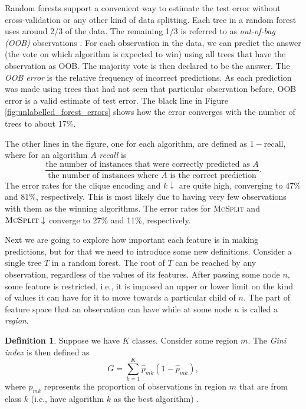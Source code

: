\documentclass{l4proj}
\theoremstyle{definition}
\newtheorem{definition}{Definition}[section]
\theoremstyle{remark}
\begin{document}
Random forests support a convenient way to estimate the test error without
cross-validation or any other kind of data splitting. Each tree in a random
forest uses around 2/3 of the data. The remaining 1/3 is referred to as
\emph{out-of-bag (OOB)} observations \cite{James:2014:ISL:2517747}. For each
observation in the data, we can predict the answer (the vote on which algorithm
is expected to win) using all trees that have the observation as OOB. The
majority vote is then declared to be the answer. The \emph{OOB error} is
the relative frequency of incorrect predictions. As each prediction was made
using trees that had not seen that particular observation before, OOB error is a
valid estimate of test error. The black line in Figure
\ref{fig:unlabelled_forest_errors} shows how the error converges with the number
of trees to about 17\%.

The other lines in the figure, one for each algorithm, are defined as $1 -
\text{recall}$, where for an algorithm $A$ \emph{recall}
\cite{citeulike:12882259} is
\[ \frac{\text{the number of instances that were correctly predicted as
      $A$}}{\text{the number of instances where $A$ is the correct
      prediction}}. \]
The error rates for the clique encoding and $k\downarrow$ are quite high,
converging to 47\% and 81\%, respectively. This is most likely due to having very
few observations with them as the winning algorithms. The error rates for
\textsc{McSplit} and $\textsc{McSplit}\downarrow$ converge to 27\% and 11\%,
respectively.

Next we are going to explore how important each feature is in making
predictions, but for that we need to introduce some new definitions. Consider a
single tree $T$ in a random forest. The root of $T$ can be reached by any
observation, regardless of the values of its features. After passing some node
$n$, some feature is restricted, i.e., it is imposed an upper or lower limit on
the kind of values it can have for it to move towards a particular child of $n$.
The part of feature space that an observation can have while at some node $n$ is
called a \emph{region}.

\begin{definition} %
  Suppose we have $K$ classes. Consider some region $m$. The \emph{Gini index}
  is then defined as
  \[ G = \sum_{k=1}^K \hat{p}_{mk}(1-\hat{p}_{mk}), \]
  where $\hat{p}_{mk}$ represents the proportion of observations in region $m$
  that are from class $k$ (i.e., have algorithm $k$ as the best algorithm)
  \cite{James:2014:ISL:2517747}.
\end{definition}
\end{document}
